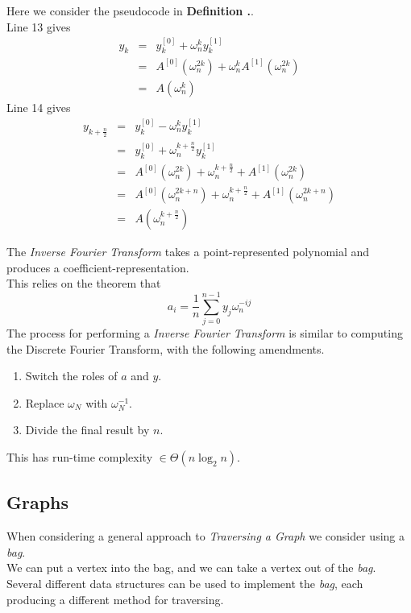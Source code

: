 \documentclass[11pt,a4paper]{article}
\begin{document}
Here we consider the pseudocode in \textbf{Definition .}.\\
Line 13 gives
\[\begin{array}{rcl}
y_k&=&y_k^{[0]}+\omega_n^ky_k^{[1]}\\
&=&A^{[0]}(\omega_n^{2k})+\omega_n^kA^{[1]}(\omega_n^{2k})\\
&=&A(\omega_n^k)
\end{array}\]
Line 14 gives
\[\begin{array}{rcl}
y_{k+\frac{n}{2}}&=&y_k^{[0]}-\omega_n^ky_k^{[1]}\\
&=&y_k^{[0]}+\omega_n^{k+\frac{n}{2}} y_k^{[1]}\\
&=&A^{[0]}(\omega_{n}^{2k})+\omega_n^{k+\frac{n}{2}}+A^{[1]}(\omega_n^{2k})\\
&=&A^{[0]}(\omega_{n}^{2k+n})+\omega_n^{k+\frac{n}{2}}+A^{[1]}(\omega_n^{2k+n})\\
&=&A(\omega_n^{k+\frac{n}{2}})
\end{array}\]

The \textit{Inverse Fourier Transform} takes a point-represented polynomial and produces a coefficient-representation.\\
This relies on the theorem that
$$a_i=\frac{1}{n}\sum_{j=0}^{n-1}y_j\omega_n^{-ij}$$
The process for performing a \textit{Inverse Fourier Transform} is similar to computing the Discrete Fourier Transform, with the following amendments.
\begin{enumerate}[label=\roman*)]
  \item Switch the roles of $a$ and $y$.
  \item Replace $\omega_N$ with $\omega_N^{-1}$.
  \item Divide the final result by $n$.
\end{enumerate}
\nb This has run-time complexity $\in\Theta(n\log_2n)$.

\subsection{Graphs}

When considering a general approach to \textit{Traversing a Graph} we consider using a \textit{bag}.\\
We can put a vertex into the bag, and we can take a vertex out of the \textit{bag}.\\
Several different data structures can be used to implement the \textit{bag}, each producing a different method for traversing.\\
\end{document}
